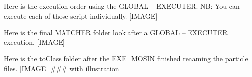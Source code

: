 Here is the execution order using the GLOBAL – EXECUTER.
NB: You can execute each of those script individually.
[IMAGE]

Here is the final MATCHER folder look after a GLOBAL – EXECUTER execution.
[IMAGE]

Here is the toClass folder after the EXE_MOSIN finished renaming the particle files.
[IMAGE]
### with illustration
    
    
    
    
    
    
    